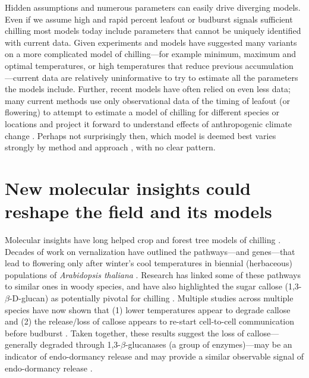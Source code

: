 \documentclass[11pt]{article}
\begin{document}
Hidden assumptions and numerous parameters can easily drive diverging models. Even if we assume high and rapid percent leafout or budburst signals sufficient chilling most models today include parameters that cannot be uniquely identified with current data.  Given experiments and models have suggested many variants on a more complicated model of chilling---for example minimum, maximum and optimal temperatures, or high temperatures that reduce previous accumulation \citep[Fig. \ref{fig:modelsketch},][]{lued2011,luedeling2012chilling,chuine2016}---current data are relatively uninformative to try to estimate all the parameters the models include. Further, recent models have often relied on even less data; many current methods use only observational data of the timing of leafout (or flowering) to attempt to estimate a model of chilling for different species or locations and project it forward to understand effects of anthropogenic climate change \citep{lued2011,luedeling2012chilling,gao2024}. Perhaps not surprisingly then, which model is deemed best varies strongly by method and approach \citep{Caffarra:2011qf,basler2016evaluating,hufkens2018integrated}, with no clear pattern. 

\section*{New molecular insights could reshape the field and its models} 

Molecular insights have long helped crop and forest tree models of chilling \citep{chuinearees}. Decades of work on vernalization have outlined the pathways---and genes---that lead to flowering only after winter's cool temperatures in biennial (herbaceous) populations of \emph{Arabidopsis thaliana} \citep[Fig. \ref{fig:molecular},][]{Wilczek:2009oa,kim2009vernalization}. Research has linked some of these pathways to similar ones in woody species, and have also highlighted the sugar callose (1,3-$\beta$-{\sc D}-glucan) as potentially pivotal for chilling \citep{vanderschoot2014,pan2021aba}. Multiple studies across multiple species have now shown that (1) lower temperatures appear to degrade callose and (2) the release/loss of callose appears to re-start cell-to-cell communication before budburst \citep{vanderschoot2014}. Taken together, these results suggest the loss of callose---generally degraded through 1,3-$\beta$-glucanases (a group of enzymes)---may be an indicator of endo-dormancy release \citep[though other factors, such as  ABA, also often change at the same time,][]{tylewicz2018photoperiodic,pan2021aba} and may provide a similar observable signal of endo-dormancy release \citep{rinne2018,andre2022populus}. 
\end{document}
